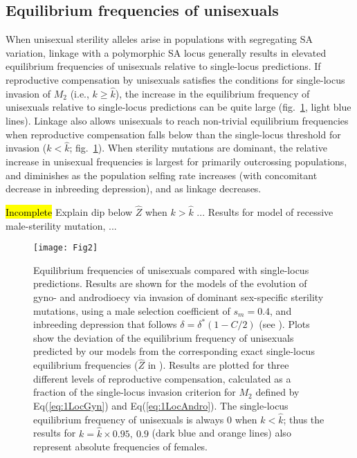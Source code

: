 \documentclass[9pt,twocolumn,twoside,lineno]{gsajnl}
\begin{document}
\subsection{Equilibrium frequencies of unisexuals}

When unisexual sterility alleles arise in populations with segregating SA variation, linkage with a polymorphic SA locus generally results in elevated equilibrium frequencies of unisexuals relative to single-locus predictions. If reproductive compensation by unisexuals satisfies the conditions for single-locus invasion of $M_2$ (i.e., $k \geq \hat{k}$), the increase in the equilibrium frequency of unisexuals relative to single-locus predictions can be quite large (fig.~\ref{fig:eqFreq}, light blue lines). Linkage also allows unisexuals to reach non-trivial equilibrium frequencies when reproductive compensation falls below than the single-locus threshold for invasion ($k < \hat{k}$; fig.~\ref{fig:eqFreq}). When sterility mutations are dominant, the relative increase in unisexual frequencies is largest for primarily outcrossing populations, and diminishes as the population selfing rate increases (with concomitant decrease in inbreeding depression), and as linkage decreases. 

\hl{Incomplete} Explain dip below $\hat{Z}$ when $k > \hat{k}$ ... Results for model of recessive male-sterility mutation, ...


\begin{figure}[htbp]
\centering
\texttt{[image: Fig2]}
\caption{Equilibrium frequencies of unisexuals compared with single-locus predictions. Results are shown for the models of the evolution of gyno- and androdioecy via invasion of dominant sex-specific sterility mutations, using a male selection coefficient of $s_m = 0.4$, and inbreeding depression that follows $\delta = \delta^\ast(1 - C/2)$ (see ). Plots show the deviation of the equilibrium frequency of unisexuals predicted by our models from the corresponding exact single-locus equilibrium frequencies ($\hat{Z}$ in \citealt{Charlesworth1978a}). Results are plotted for three different levels of reproductive compensation, calculated as a fraction of the single-locus invasion criterion for $M_2$ defined by Eq(\ref{eq:1LocGyn}) and Eq(\ref{eq:1LocAndro}). The single-locus equilibrium frequency of unisexuals is always $0$ when $k < \hat{k}$; thus the results for $k = \hat{k} \times 0.95,~0.9$ (dark blue and orange lines) also represent absolute frequencies of females.}
\label{fig:eqFreq}
\end{figure}
\end{document}
